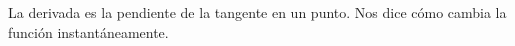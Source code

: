 \documentclass[preview]{standalone}
\begin{document}
\begin{center}
La derivada es la pendiente de la tangente en un punto.
Nos dice cómo cambia la función instantáneamente.
\end{center}
\end{document}
